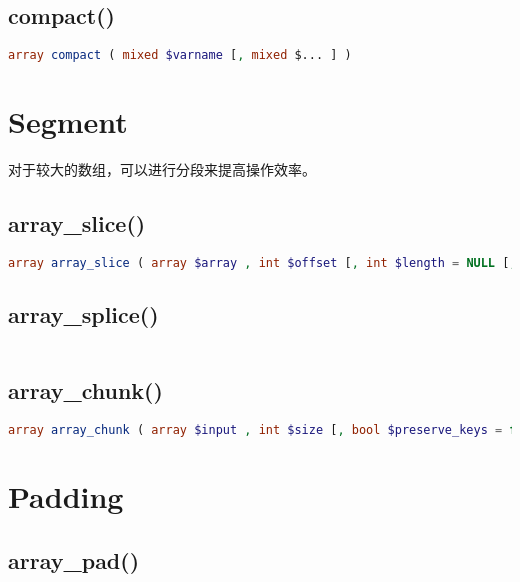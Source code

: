 \subsection{compact()}



\begin{lstlisting}[language=PHP]
array compact ( mixed $varname [, mixed $... ] )
\end{lstlisting}

\section{Segment}


对于较大的数组，可以进行分段来提高操作效率。

\subsection{array\_slice()}




\begin{lstlisting}[language=PHP]
array array_slice ( array $array , int $offset [, int $length = NULL [, bool $preserve_keys = false ]] )
\end{lstlisting}


\subsection{array\_splice()}


\begin{lstlisting}[language=PHP]

\end{lstlisting}


\subsection{array\_chunk()}


\begin{lstlisting}[language=PHP]
array array_chunk ( array $input , int $size [, bool $preserve_keys = false ] )
\end{lstlisting}


\section{Padding}

\subsection{array\_pad()}




